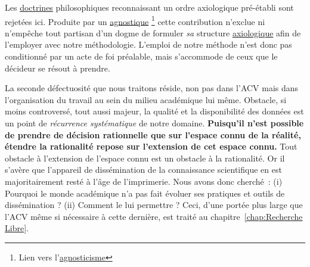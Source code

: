 Les \href{http://www.cnrtl.fr/definition/doctrine}{doctrines} philosophiques reconnaissant un ordre axiologique pré-établi sont rejetées ici.
Produite par un \href{http://www.cnrtl.fr/definition/agnostique}{agnostique}
\footnote{Lien vers l'\href{http://www.cnrtl.fr/definition/agnosticisme}{agnosticisme}}
cette contribution n'exclue ni n’empêche tout partisan d'un dogme de formuler \emph{sa} structure \href{http://www.cnrtl.fr/definition/axiologie}{axiologique} afin de l'employer avec notre méthodologie. %
L'emploi de notre méthode n'est donc pas conditionné par un acte de foi préalable, mais s’accommode de ceux que le décideur se résout à prendre.

La seconde défectuosité que nous traitons réside, non pas dans l'\gls{ACV} mais dans l'organisation du travail au sein du milieu académique lui même.
Obstacle, si moins controversé, tout aussi majeur, la qualité et la disponibilité des données est un point de \textit{récurrence systématique} de notre domaine.
\textbf{Puisqu'il n'est possible de prendre de décision rationnelle que sur l'espace connu de la réalité, étendre la rationalité repose sur l'extension de cet espace connu.}
Tout obstacle à l'extension de l'espace connu est un obstacle à la rationalité.
Or il s'avère que l'appareil de dissémination de la connaissance scientifique en est majoritairement resté à l'âge de l'imprimerie.
Nous avons donc cherché~:
(i) Pourquoi le monde académique n'a pas fait évoluer ses pratiques et outils de dissémination ? (ii) Comment le lui permettre ?
Ceci, d'une portée plus large que l'ACV même si nécessaire à cette dernière, est traité au chapitre~\ref{chap:Recherche Libre}.